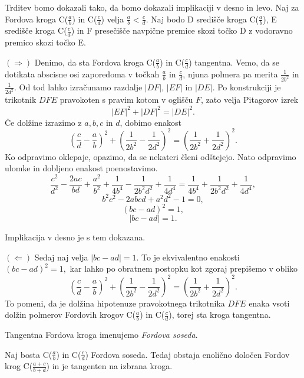 \documentclass[mat1]{fmfdelo}
\begin{document}
\begin{dokaz}
%
Trditev bomo dokazali tako, da bomo dokazali implikaciji v desno in levo.
Naj za Fordova kroga C($\frac{a}{b}$) in C($\frac{c}{d}$) velja $\frac{a}{b} < \frac{c}{d}$.
Naj bodo D središče kroga C($\frac{a}{b}$), E središče kroga C($\frac{c}{d}$) in F presečišče navpične premice skozi točko D z vodoravno premico skozi točko E.

\( (\Rightarrow) \)
Denimo, da sta Fordova kroga C($\frac{a}{b}$) in C($\frac{c}{d}$) tangentna. Vemo, da se dotikata abscisne osi zaporedoma v točkah $\frac{a}{b}$ in $\frac{c}{d}$, njuna polmera pa merita $\frac{1}{2b^2}$ in $\frac{1}{2d^2}$. Od tod lahko izračunamo razdalje $|DF|$, $|EF|$ in $|DE|$. Po konstrukciji je trikotnik $DFE$ pravokoten s pravim kotom v oglišču $F$, zato velja Pitagorov izrek
\[ |EF|^2 + |DF|^2 = |DE|^2. \]
Če dolžine izrazimo z $a, b, c$ in $d$, dobimo enakost
\[ \left (\frac{c}{d} - \frac{a}{b} \right )^2 + \left (\frac{1}{2b^2} - \frac{1}{2d^2} \right )^2 = \left (\frac{1}{2b^2} + \frac{1}{2d^2} \right )^2. \]
Ko odpravimo oklepaje, opazimo, da se nekateri členi odštejejo. Nato odpravimo ulomke in dobljeno enakost poenostavimo.
\[  \frac{c^2}{d^2} - \frac{2ac}{bd} + \frac{a^2}{b^2} + \frac{1}{4b^4} - \frac{1}{2b^{2}d^{2}} + \frac{1}{4d^4} = \frac{1}{4b^4} + \frac{1}{2b^{2}d^{2}} + \frac{1}{4d^4}, \]
\[ b^{2}c^{2} - 2abcd + a^{2}d^{2} - 1 = 0, \]
\[  (bc-ad)^2 = 1, \]
\[ |bc-ad|=1. \]

Implikacija v desno je s tem dokazana.

\( (\Leftarrow) \)
Sedaj naj velja $|bc-ad|=1$. To je ekvivalentno enakosti $ (bc-ad)^2 = 1, $ kar lahko po obratnem postopku kot zgoraj prepišemo v obliko 
\[ \left (\frac{c}{d} - \frac{a}{b} \right )^2 + \left (\frac{1}{2b^2} - \frac{1}{2d^2} \right )^2 = \left (\frac{1}{2b^2} + \frac{1}{2d^2} \right )^2. \]
To pomeni, da je dolžina hipotenuze pravokotnega trikotnika $DFE$ enaka vsoti dolžin polmerov Fordovih krogov C($\frac{a}{b}$) in C($\frac{c}{d}$), torej sta kroga tangentna.
%
\end{dokaz}

\begin{definicija}
Tangentna Fordova kroga imenujemo \emph{Fordova soseda}.
\end{definicija}

\begin{trditev}
Naj bosta C($\frac{a}{b}$) in C($\frac{c}{d}$) Fordova soseda. Tedaj obstaja enolično določen Fordov krog C($\frac{a+c}{b+d}$) in je tangenten na izbrana kroga.
\end{trditev}
\end{document}
